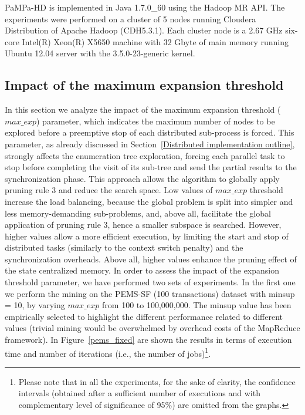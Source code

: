 PaMPa-HD is implemented in Java 1.7.0\_60 using the Hadoop MR API.
The experiments were performed on a cluster of 5 nodes running Cloudera
Distribution of Apache Hadoop (CDH5.3.1).
Each cluster node is a 2.67 GHz six-core Intel(R) Xeon(R) X5650 machine
with 32 Gbyte of main memory
running Ubuntu 12.04 server with the 3.5.0-23-generic kernel.


\subsection{Impact of the maximum expansion threshold}\label{exp_fisso}
In this section we analyze the impact of the maximum expansion threshold
($max\_exp$) parameter, which indicates the maximum number of nodes
to be explored before a preemptive stop of each distributed sub-process is forced.
This parameter, as already discussed in Section~\ref{Distributed implementation outline},
strongly affects the enumeration tree exploration,
forcing each parallel task to stop before completing the visit of its sub-tree
and send the partial results to the synchronization phase.
This approach allows the algorithm to globally apply
pruning rule 3 and reduce the search space.
Low values of $max\_exp$ threshold increase the load balancing,
because the global problem is split into simpler and less memory-demanding
sub-problems, and, above all, facilitate the global application of pruning rule 3,
hence a smaller subspace is searched.
However, higher values allow a more efficient execution,
by limiting the start and stop of distributed tasks
(similarly to the context switch penalty) and the synchronization overheads. Above all, higher values enhance the pruning effect of the state centralized memory.
In order to assess the impact of the expansion threshold parameter, we have performed two sets of experiments. In the first one we perform the mining on the PEMS-SF (100 transactions) dataset with minsup = 10, by varying $max\_exp$ from 100 to 100,000,000.  The minsup value has been empirically selected to highlight the different performance related to different values (trivial mining would be overwhelmed by overhead costs of the MapReduce framework).
In Figure~\ref{pems_fixed} are shown the results in terms of execution time and number of iterations
(i.e., the number of jobs)\footnote{Please note that in all the experiments, for the sake of clarity, the confidence intervals (obtained after a sufficient number of executions and with  complementary level of significance of 95\%) are omitted from the graphs.}.
